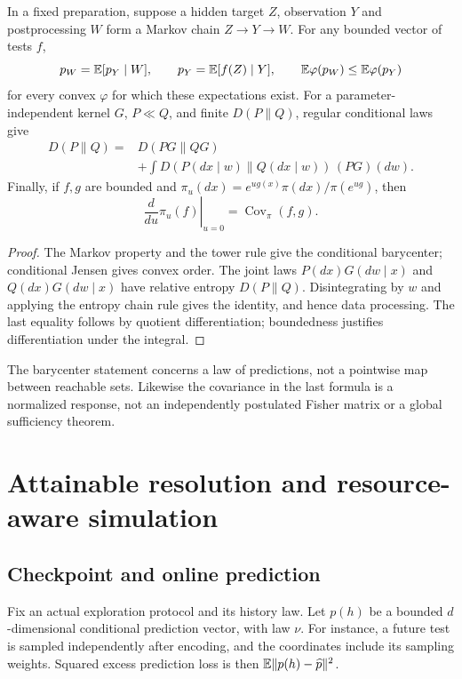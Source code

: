 \begin{proposition}
\label{prop:prepared-geometry}
In a fixed preparation, suppose a hidden target $Z$, observation $Y$
and postprocessing $W$ form a Markov chain $Z\to Y\to W$.
For any bounded vector of tests $f$,
\[
 p_W=\mathbb E[p_Y\mid W],\qquad p_Y=\mathbb E[f(Z)\mid Y],\qquad
 \mathbb E\varphi(p_W)\le\mathbb E\varphi(p_Y)
\]
for every convex $\varphi$ for which these expectations exist.
For a parameter-independent kernel $G$, $P\ll Q$, and finite
$D(P\|Q)$, regular conditional laws give
\begin{align*}
 D(P\|Q)={}&D(PG\|QG)\\
 &+\int D(P(dx\mid w)\|Q(dx\mid w))\,(PG)(dw).
\end{align*}
Finally, if $f,g$ are bounded and
$\pi_u(dx)=e^{ug(x)}\pi(dx)/\pi(e^{ug})$, then
\[
               \left.\frac{d}{du}\pi_u(f)\right|_{u=0}
                          =\operatorname{Cov}_\pi(f,g).
\]
\end{proposition}
\begin{proof}
The Markov property and the tower rule give the conditional barycenter;
conditional Jensen gives convex order. The joint laws $P(dx)G(dw\mid x)$
and $Q(dx)G(dw\mid x)$ have relative entropy $D(P\|Q)$.
Disintegrating by $w$ and applying the entropy chain rule gives the
identity, and hence data processing. The last equality follows by
quotient differentiation; boundedness justifies differentiation under
the integral.
\end{proof}
The barycenter statement concerns a law of predictions, not a
pointwise map between reachable sets. Likewise the covariance in the
last formula is a normalized response, not an independently postulated
Fisher matrix or a global sufficiency theorem.

\section{Attainable resolution and resource-aware simulation}
\label{sec:resolution}
\subsection{Checkpoint and online prediction}
Fix an actual exploration protocol and its history law. Let $p(h)$ be a
bounded $d$-dimensional conditional prediction vector, with law $\nu$.
For instance, a future test is sampled independently after encoding,
and the coordinates include its sampling weights. Squared excess
prediction loss is then $\mathbb E\|p(h)-\widehat p\|^2$.

